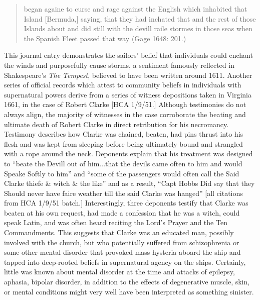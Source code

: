 \documentclass[12pt]{article}
\newenvironment{styleStandard}{\renewcommand\baselinestretch{1.0}\setlength\leftskip{0cm}\setlength\rightskip{0cm plus 1fil}\setlength\parindent{0cm}\setlength\parfillskip{0pt plus 1fil}\setlength\parskip{0in plus 1pt}\writerlistparindent\writerlistleftskip\leavevmode\normalfont\normalsize\writerlistlabel\ignorespaces}{\unskip\vspace{0in plus 1pt}\par}
\newcommand\writerlistleftskip{}
\newcommand\writerlistparindent{}
\newcommand\writerlistlabel{}
\begin{document}
\begin{quotation}
began againe to curse and rage against the English which inhabited that Island [Bermuda,] saying, that they had inchated that and the rest of those Islands about and did still with the devill raile stormes in those seas when the Spanish Fleet passed that way (Gage 1648: 201.) 

\end{quotation}
\begin{styleStandard}
This journal entry demonstrates the sailors’ belief that individuals could enchant the winds and purposefully cause storms, a sentiment famously reflected in Shakespeare’s \textit{The Tempest}, believed to have been written around 1611. Another series of official records which attest to community beliefs in individuals with supernatural powers derive from a series of witness depositions taken in Virginia 1661, in the case of Robert Clarke [HCA 1/9/51.] Although testimonies do not always align, the majority of witnesses in the case corroborate the beating and ultimate death of Robert Clarke in direct retribution for his necromancy. Testimony describes how Clarke was chained, beaten, had pins thrust into his flesh and was kept from sleeping before being ultimately bound and strangled with a rope around the neck. Deponents explain that his treatment was designed to “beate the Devill out of him...that the devils came often to him and would Speake Softly to him” and “some of the passengers would often call the Said Clarke thiefe \& witch \& the like” and as a result, “Capt Hobbs Did say that they Should never have faire weather till the said Clarke was hanged” [all citations from HCA 1/9/51 batch.] Interestingly, three deponents testify that Clarke was beaten at his own request, had made a confession that he was a witch, could speak Latin, and was often heard reciting the Lord’s Prayer and the Ten Commandments. This suggests that Clarke was an educated man, possibly involved with the church, but who potentially suffered from schizophrenia or some other mental disorder that provoked mass hysteria aboard the ship and tapped into deep-rooted beliefs in supernatural agency on the ships. Certainly, little was known about mental disorder at the time and attacks of epilepsy, aphasia, bipolar disorder, in addition to the effects of degenerative muscle, skin, or mental conditions might very well have been interpreted as something sinister. 
\end{styleStandard}
\end{document}
